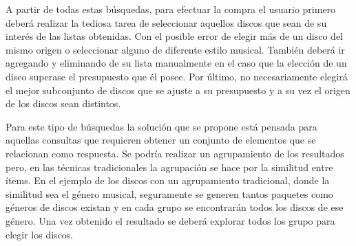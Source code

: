 A partir de todas estas búsquedas, para efectuar la compra el usuario primero deberá realizar la tediosa tarea de seleccionar aquellos discos que sean de su interés de las listas obtenidas. Con el posible error de elegir más de un disco del mismo origen o seleccionar alguno de diferente estilo musical. También deberá ir agregando y eliminando de su lista manualmente en el caso que la elección de un disco superase el presupuesto que él posee. Por último, no necesariamente elegirá el mejor subconjunto de discos que se ajuste a su presupuesto y a su vez el origen de los discos sean distintos.

Para este tipo de búsquedas la solución que se propone está pensada para aquellas consultas que requieren obtener un conjunto de elementos que se relacionan como respuesta. Se podría realizar un agrupamiento de los resultados pero, en las técnicas tradicionales la agrupación se hace por la similitud entre ítems. En el ejemplo de los discos con un agrupamiento tradicional, donde la similitud sea el género musical, seguramente se generen tantos paquetes como géneros de discos existan y en cada grupo se encontrarán todos los discos de ese género. Una vez obtenido el resultado se deberá explorar todos los grupo para elegir los discos.

